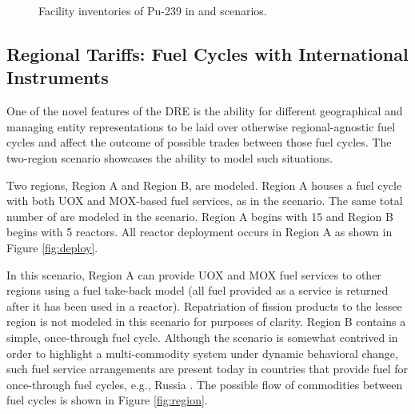 \begin{figure}
  \centering
  \begin{minipage}{0.67\textwidth}
    \centering 
    \vfill 
  \end{minipage}%
  \begin{minipage}{0.33\textwidth}
    \centering
  \end{minipage}%
  \caption[]{
    \label{fig:military}
    Facility inventories of Pu-239 in \basecase and \external scenarios.}
\end{figure}

\subsection{Regional Tariffs: Fuel Cycles with International Instruments}

One of the novel features of the DRE is the ability for different geographical
and managing entity representations to be laid over otherwise regional-agnostic
fuel cycles and affect the outcome of possible trades between those fuel
cycles. The \tariff two-region scenario showcases the ability to model
such situations.

Two regions, Region A and Region B, are modeled. Region A houses a fuel cycle
with both UOX and MOX-based fuel services, as in the \basecase scenario. The
same total number of \reactors are modeled in the scenario. Region A begins with
15 \reactors and Region B begins with 5 reactors. All reactor deployment occurs
in Region A as shown in Figure \ref{fig:deploy}.

In this scenario, Region A can provide UOX and MOX fuel services to other
regions using a fuel take-back model (all fuel provided as a service is returned
after it has been used in a reactor). Repatriation of fission products to the
lessee region is not modeled in this scenario for purposes of clarity. Region B
contains a simple, once-through fuel cycle. Although the scenario is somewhat
contrived in order to highlight a multi-commodity system under dynamic
behavioral change, such fuel service arrangements are present today in countries
that provide fuel for once-through fuel cycles, e.g., Russia
\cite{wnarussia2016}. The possible flow of commodities between fuel cycles is
shown in Figure \ref{fig:region}.

